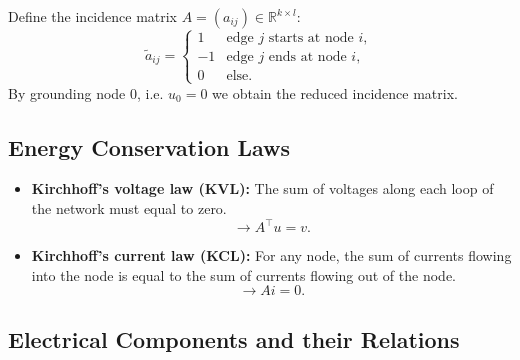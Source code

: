 	\begin{frame}
		Define the incidence matrix $A = (a_{ij}) \in \mathbb{R}^{k \times l}$:
		\begin{displaymath}
			\tilde{a}_{ij} = 
			\begin{cases}
				1 &   \text{edge $j$ starts at node $i$},\\
				-1 &  \text{edge $j$  ends at node $i$},\\
				0 & \text{else}.				
			\end{cases}
		\end{displaymath}
		By grounding node $0$, i.e. $u_0 = 0$ we obtain the reduced incidence matrix.
	\end{frame}

	\subsection{Energy Conservation Laws}
	\begin{frame}
		\begin{itemize}
			\item \textbf{Kirchhoff's voltage law (KVL):} \newline
			The sum of voltages along each loop of the network must equal to zero.
			\begin{equation}
				\label{KVL}
				\to A^\top  u = v.
			\end{equation}
			\item \textbf{Kirchhoff's current law (KCL):} \newline
			For any node, the sum of currents flowing into the node is equal to the sum of currents flowing out of the node.
			\begin{equation}
				\label{KCL}
				\to A  i = 0.
			\end{equation}
		\end{itemize}
	\end{frame}

	\subsection{Electrical Components and their Relations}
		
